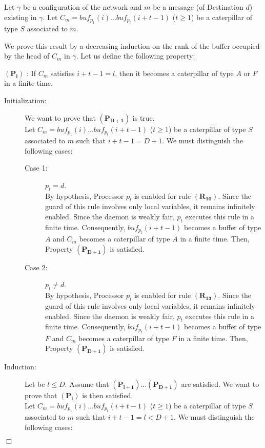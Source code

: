 \documentclass[11pt]{article}
\newenvironment{proof}{{\noindent\bf Proof. } }{{\hfill $\Box$}}
\begin{document}
\begin{proof}
Let $\gamma$ be a configuration of the network and $m$ be a message (of Destination $d$) existing in $\gamma$. Let $C_{m}=buf_{p_{1}}(i)...buf_{p_{t}}(i+t-1)$ ($t\geq1$) be a caterpillar of type $S$ associated to $m$.

We prove this result by a decreasing induction on the rank of the buffer occupied by the head of $C_{m}$ in $\gamma$. Let us define the following property:

$\boldsymbol{(P_{l})}$ : If $C_{m}$ satisfies $i+t-1=l$, then it becomes a caterpillar of type $A$ or $F$ in a finite time.

\begin{description}
\item [Initialization:] We want to prove that $\boldsymbol{(P_{D+1})}$ is true.\\
Let $C_{m}=buf_{p_{1}}(i)...buf_{p_{t}}(i+t-1)$ ($t\geq1$) be a caterpillar of type $S$ associated to $m$ such that $i+t-1=D+1$. We must distinguish the following cases:

\begin{description}
\item [Case 1:] $p_{t}=d$.\\
By hypothesis, Processor $p_{t}$ is enabled for rule $\boldsymbol{(R_{10})}$. Since the guard of this rule involves only local variables, it remains infinitely enabled. Since the daemon is weakly fair, $p_{t}$ executes this rule in a finite time. Consequently, $buf_{p_{t}}(i+t-1)$ becomes a buffer of type $A$ and $C_{m}$ becomes a caterpillar of type $A$ in a finite time. Then, Property $\boldsymbol{(P_{D+1})}$ is satisfied.
\item [Case 2:] $p_{t}\neq d$.\\
By hypothesis, Processor $p_{t}$ is enabled for rule $\boldsymbol{(R_{13})}$. Since the guard of this rule involves only local variables, it remains infinitely enabled. Since the daemon is weakly fair, $p_{t}$ executes this rule in a finite time. Consequently, $buf_{p_{t}}(i+t-1)$ becomes a buffer of type $F$ and $C_{m}$ becomes a caterpillar of type $F$ in a finite time. Then, Property $\boldsymbol{(P_{D+1})}$ is satisfied.
\end{description}

\item [Induction:] Let be $l\leq D$. Assume that $\boldsymbol{(P_{l+1})}...\boldsymbol{(P_{D+1})}$ are satisfied. We want to prove that $\boldsymbol{(P_{l})}$ is then satisfied.\\
Let $C_{m}=buf_{p_{1}}(i)...buf_{p_{t}}(i+t-1)$ ($t\geq1$) be a caterpillar of type $S$ associated to $m$ such that $i+t-1=l<D+1$. We must distinguish the following cases:


\end{description}
\end{proof}
\end{document}
